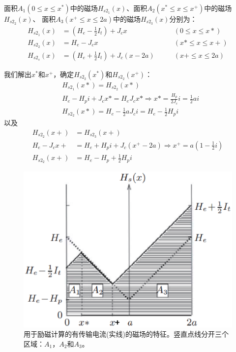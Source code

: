 面积$A_1(0\le x\le x^*)$中的磁场$H_{s2_1}(x)$、面积$A_2(x^*\le x\le x^+)$中的磁场$H_{s2_2}(x)$、
面积$A_3(x^+\le x\le 2a)$中的磁场$H_{s2_3}(x)$分别为：
\begin{align*}
H_{s2_{1}}(x)&=(H_{e}-\frac{1}{2}I_{t})+J_{c}x\qquad&(0\leq x\leq x*)\\
H_{s2_{2}}(x)&=H_{e}-J_{c}x\qquad&(x*\leq x\leq x+)\\
H_{s2_{s}}(x)&=(H_{e}+\frac{1}{2}I_{t})+J_{c}(x-2a)\qquad&(x+\leq x\leq2a)
\end{align*}

我们解出$x^*$和$x^+$，确定$H_{s2_2}(x^*)$和$H_{s2_2}(x^+)$：
\begin{align*}
&H_{{s}2_{1}}(x*)=H_{s2_{2}}(x*)\\
&H_{e}-H_{p}i+J_{c}x*=H_{e}J_{c}x*\Rightarrow x*=\frac{H_{p}}{2J_{c}}i=\frac{1}{2}ai\\
&H_{s2_{2}}(x*)=H_{e}-\frac{1}{2}aJ_{c}i=H_{e}-\frac{1}{2}H_{p}i
\end{align*}
以及
\begin{align*}
H_{s2_{2}}(x+)&=H_{s2_{3}}(x+)\\
H_{e}-J_{c}x+&=H_{e}+H_{p}i+J_{c}(x^{+}-2a)\Rightarrow x^{+}=a(1-\frac{1}{2}i)\\
H_{s2_{2}}(x+)&=H_{e}-H_{p}+\frac{1}{2}H_{p}i
\end{align*}

\begin{figure}[htbp]
	\centering
	\includegraphics[scale=0.6]{chpt5/figs/fig5.10.eps}
	\caption{用于励磁计算的有传输电流(实线)的磁场的特征。竖直点线分开三个区域：$A_1， A_2$和$A_3$。}
\end{figure}

